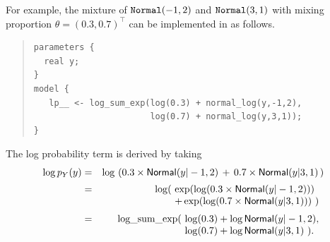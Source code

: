 For example, the mixture of ${\tt Normal}(-1,2)$ and
${\tt Normal}(3,1)$ with mixing proportion $\theta =
(0.3,0.7)^{\top}$ can be implemented in \Stan as follows.
%
\begin{quote}
\begin{Verbatim}
parameters {
  real y;
}
model {
   lp__ <- log_sum_exp(log(0.3) + normal_log(y,-1,2),
                       log(0.7) + normal_log(y,3,1));
}
\end{Verbatim}
\end{quote}
%
The log probability term is derived by taking
\begin{eqnarray*}
\log p_Y(y) & = & \log \, \left( 0.3 \times \mbox{\sf Normal}(y|-1,2) \, + \,
  0.7 \times
  \mbox{\sf Normal}(y|3,1) \, \right)
\\[2pt]
& = & \log(\! \begin{array}[t]{l}
                 \exp(\log(0.3 \times \mbox{\sf Normal}(y|-1,2))) \\
                 + \exp(\log(0.7 \times \mbox{\sf Normal}(y|3,1))) \ )
              \end{array}
\\[2pt]
& = & \mbox{log\_sum\_exp}(\! \begin{array}[t]{l}
                         \log(0.3) + \log \mbox{\sf Normal}(y|-1,2),
                         \\                  
                         \log(0.7) + \log \mbox{\sf Normal}(y|3,1) \ ).
                       \end{array}
\end{eqnarray*}

